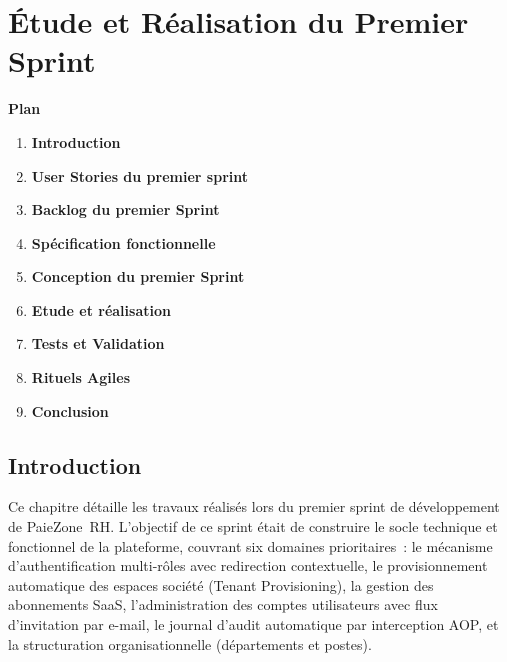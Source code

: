 
\newpage
\chapter{Étude et Réalisation du Premier Sprint}
\vspace{2.5cm}

\noindent \textbf{\Large Plan}
\vspace{0.8cm}
\begin{enumerate}[label=\textbf{\arabic*}, leftmargin=1.5cm, labelsep=0.8cm]
    \item[] \hspace*{-1.5cm}\textbf{Introduction} \dotfill \pageref{sec:s1-intro}
    \item \textbf{User Stories du premier sprint} \dotfill \pageref{sec:s1-userstories}
    \item \textbf{Backlog du premier Sprint} \dotfill \pageref{sec:s1-backlog}
    \item \textbf{Spécification fonctionnelle} \dotfill \pageref{sec:s1-specification}
    \item \textbf{Conception du premier Sprint} \dotfill \pageref{sec:s1-conception}
    \item \textbf{Etude et réalisation} \dotfill \pageref{sec:s1-realisation}
    \item \textbf{Tests et Validation} \dotfill \pageref{sec:s1-tests}
    \item \textbf{Rituels Agiles } \dotfill \pageref{sec:s1-rituels}
    \item[] \hspace*{-1.5cm}\textbf{Conclusion} \dotfill \pageref{sec:s1-conclusion}
\end{enumerate}
\vfill
\newpage

\section*{Introduction}
\label{sec:s1-intro}

Ce chapitre détaille les travaux réalisés lors du premier sprint de développement de
  PaieZone~RH. L'objectif de ce sprint était de construire le socle technique et fonctionnel
  de la plateforme, couvrant six domaines prioritaires~: le mécanisme d'authentification
  multi-rôles avec redirection contextuelle, le provisionnement automatique des espaces
  société (Tenant Provisioning), la gestion des abonnements SaaS, l'administration des
  comptes utilisateurs avec flux d'invitation par e-mail, le journal d'audit automatique par
  interception AOP, et la structuration organisationnelle (départements et postes).

